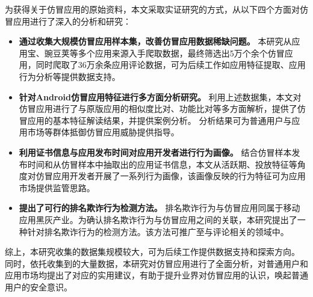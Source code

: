为获得关于仿冒应用的原始资料，本文采取实证研究的方式，从以下四个方面对仿冒应用进行了深入的分析和研究：
%
\vspace{-5mm}
\begin{itemize}
    \setlength{\itemsep}{1pt}
          \setlength{\parskip}{0pt}
          \setlength{\parsep}{0pt}
    \item \textbf{通过收集大规模仿冒应用样本集，改善仿冒应用数据稀缺问题。}
          本研究从应用宝、豌豆荚等多个应用来源入手爬取数据，最终筛选出5万个余个仿冒应用，同时爬取了36万余条应用评论数据，可为后续工作如应用特征提取、应用行为分析等提供数据支持。

    \item \textbf{针对Android仿冒应用特征进行多方面分析研究。}
          利用上述数据集，本文对仿冒应用进行了与原版应用的相似度比对、功能比对等多方面解析，提供了仿冒应用的基本特征解读结果，并提供案例分析。
          分析结果可为普通用户与应用市场等群体抵御仿冒应用威胁提供指导。

    \item \textbf{利用证书信息与应用发布时间对应用开发者进行行为画像。}
          结合仿冒样本发布时间和从仿冒样本中抽取出的应用证书信息，本文从活跃期、投放特征等角度对仿冒应用开发者开展了一系列行为画像，该画像反映的行为特征可为应用市场提供监管思路。

    \item \textbf{提出了可行的排名欺诈行为检测方法。}
          排名欺诈行为与仿冒应用同属于移动应用黑灰产业。为确认排名欺诈行为与仿冒应用之间的关联，本研究提出了一种针对排名欺诈行为的检测方法。该方法可推广至与评论相关的领域中。
\end{itemize}
\vspace{-3mm}

综上，本研究收集的数据集规模较大，可为后续工作提供数据支持和探索方向。
同时，依托收集到的大量数据，本研究对仿冒应用进行了全面分析，对普通用户和应用市场均提出了对应的实用建议，有助于提升业界对仿冒应用的认识，唤起普通用户的安全意识。

 
